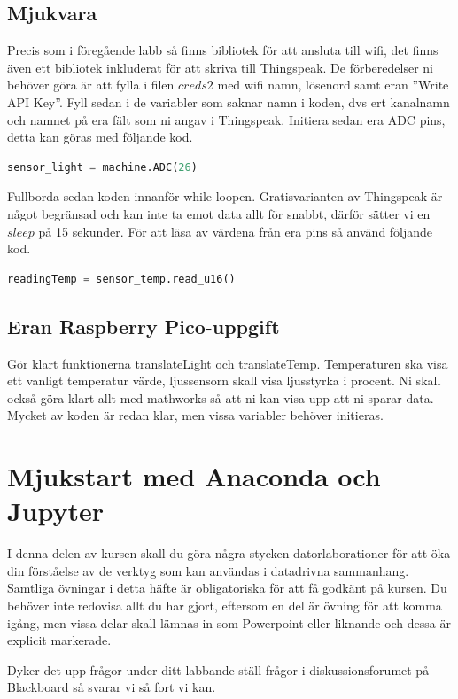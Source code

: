 \documentclass{article}
\begin{document}
\subsection{Mjukvara}
Precis som i föregående labb så finns bibliotek för att ansluta till wifi, det finns även ett bibliotek inkluderat för att skriva till Thingspeak. De förberedelser ni behöver göra är att fylla i filen $creds2$ med wifi namn, lösenord samt eran ''Write API Key''. Fyll sedan i de variabler som saknar namn i koden, dvs ert kanalnamn och namnet på era fält som ni angav i Thingspeak. Initiera sedan era ADC pins, detta kan göras med följande kod.
\begin{lstlisting}[language=Python]
    sensor_light = machine.ADC(26)
\end{lstlisting}
Fullborda sedan koden innanför while-loopen. Gratisvarianten av Thingspeak är något begränsad och kan inte ta emot data allt för snabbt, därför sätter vi en $sleep$ på 15 sekunder. För att läsa av värdena från era pins så använd följande kod.
\begin{lstlisting}[language=Python]
    readingTemp = sensor_temp.read_u16() 
\end{lstlisting}
\subsection{Eran Raspberry Pico-uppgift}
Gör klart funktionerna translateLight och translateTemp. Temperaturen ska visa ett vanligt temperatur värde, ljussensorn skall visa ljusstyrka i procent. Ni skall också göra klart allt med mathworks så att ni kan visa upp att ni sparar data. Mycket av koden är redan klar, men vissa variabler behöver initieras.

\pagebreak


\section{Mjukstart med Anaconda och Jupyter}
I denna delen av kursen skall du göra några stycken datorlaborationer för att öka din förståelse av de verktyg som kan användas i datadrivna sammanhang. 
Samtliga övningar i detta häfte är obligatoriska för att få godkänt på kursen. Du behöver inte redovisa allt du har gjort, eftersom en del är övning för att komma igång, men vissa delar skall lämnas in som Powerpoint eller liknande och dessa är explicit markerade.

Dyker det upp frågor under ditt labbande ställ frågor i diskussionsforumet på Blackboard så svarar vi så fort vi kan.
\end{document}
